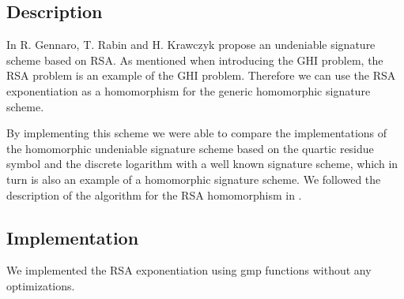 \documentclass[a4paper, 11pt]{article}
\begin{document}
 \subsection{Description} 
 In \cite{gennaro} R. Gennaro, T. Rabin and H. Krawczyk propose an undeniable signature scheme based on RSA. As mentioned when introducing the GHI problem, the RSA problem is an example of the GHI problem. Therefore we can use the RSA exponentiation as a homomorphism for the generic homomorphic signature scheme. 
 
 By implementing this scheme we were able to compare the implementations of the homomorphic undeniable signature scheme based on the quartic residue symbol and the discrete logarithm with a well known signature scheme, which in turn is also an example of a homomorphic signature scheme. We followed the description of the algorithm for the RSA homomorphism in \cite{handbook}. 
 
 \begin{comment} 
 \begin{algorithm}[htb] 
 \caption{Generate Public and Private Key for RSA Signature Scheme} 
 \label{alg5} 
 \begin{algorithmic}[1] 
 \ENSURE Public key $pk = (n,e)$, secret key $sk= (p,q,\phi,d)$ 
 \STATE generate large primes $p$ and $q$ 
 \STATE compute $n=pq$ and $\phi = (p-1)(q-1)$ 
 \STATE select random integer e, $1 < e < \phi$, such that $ \gcd(e,\phi)=1$ 
 \STATE compute integer $ d=e^{-1}\bmod \phi $ 
 \STATE $pk = (n,e)$, $sk= (p,q,\phi,d)$ 
 \end{algorithmic} 
 \end{algorithm} 
 
 \begin{algorithm}[htb] 
 \caption{Compute RSA Signature} 
 \label{alg6} 
 \begin{algorithmic}[1] 
 \REQUIRE $pk = (n,e)$, $sk= (p,q,\phi,d),~ m \in \mathbb{Z}_n$ message to sign 
 \ENSURE $s$ is RSA signature for $m$ 
 \STATE $s = m^d \bmod n$ 
 \end{algorithmic} 
 \end{algorithm} 
 
 \end{comment} 
 
 \subsection{Implementation} 
 We implemented the RSA exponentiation using gmp functions  \normalfont without any optimizations. 
 
\end{document}
